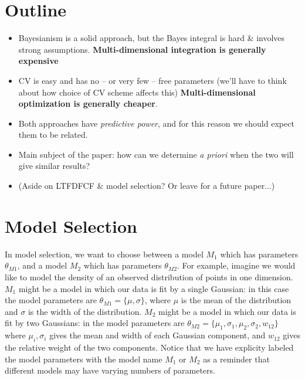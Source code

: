 \documentclass[12pt]{article}
\begin{document}
\section{Outline}
\begin{itemize}
\item Bayesianism is a solid approach, but the Bayes integral is hard \&
  involves strong assumptions. {\bf Multi-dimensional integration
    is generally expensive}
\item CV is easy and has no -- or very few -- free parameters (we'll have to
  think about how choice of CV scheme affects this)
  {\bf Multi-dimensional optimization is generally cheaper}.
\item Both approaches have {\it predictive power}, and for this reason we
  should expect them to be related.
\item Main subject of the paper: how can we determine {\it a priori} when the
  two will give similar results?
\item (Aside on LTFDFCF \& model selection?  Or leave for a future paper...)
\end{itemize}

\section{Model Selection}
In model selection, we want to choose between a model $M_1$ which has
parameters $\theta_{M1}$, and a model $M_2$ which has parameters $\theta_{M2}$.
For example, imagine we would like to model the density of an observed
distribution of points in one dimension.  
$M_1$ might be a model in which our data is fit by a single
Gaussian: in this case the model parameters are $\theta_{M1} = \{\mu, \sigma\}$,
where $\mu$ is the mean of the distribution and $\sigma$ is the width of the
distribution.  $M_2$ might be a model in which our data is fit by two
Gaussians: in the model parameters are
$\theta_{M2} = \{\mu_1,\sigma_1,\mu_2,\sigma_2,w_{12}\}$ where $\mu_i,\sigma_i$
gives the mean and width of each Gaussian component, and $w_{12}$ gives the
relative weight of the two components. Notice that we have explicity
labeled the model parameters with the model name $M_1$ or $M_2$ as a reminder
that different models may have varying numbers of parameters.
\end{document}
